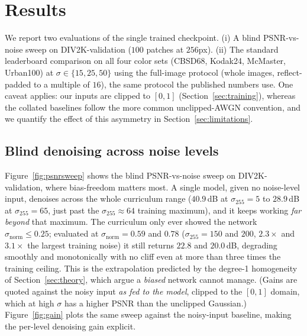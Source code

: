 \documentclass{article}
\newcommand{\sigpx}{\sigma_{255}}
\begin{document}
\clearpage
\section{Results}
\label{sec:results}

We report two evaluations of the single trained checkpoint. (i) A blind PSNR-vs-noise sweep on DIV2K-validation ($100$ patches at $256$px). (ii) The standard leaderboard comparison on all four color sets (CBSD68, Kodak24, McMaster, Urban100) at $\sigma \in \{15,25,50\}$ using the full-image protocol (whole images, reflect-padded to a multiple of $16$), the same protocol the published numbers use. One caveat applies: our inputs are clipped to $[0,1]$ (Section~\ref{sec:training}), whereas the collated baselines follow the more common unclipped-AWGN convention, and we quantify the effect of this asymmetry in Section~\ref{sec:limitations}.

\subsection{Blind denoising across noise levels}
Figure~\ref{fig:psnrsweep} shows the blind PSNR-vs-noise sweep on DIV2K-validation, where bias-freedom matters most. A single model, given no noise-level input, denoises across the whole curriculum range ($40.9$\,dB at $\sigpx{=}5$ to $28.9$\,dB at $\sigpx{=}65$, just past the $\sigpx{\approx}64$ training maximum), and it keeps working \emph{far beyond} that maximum. The curriculum only ever showed the network $\sigma_{\mathrm{norm}}\!\le\!0.25$; evaluated at $\sigma_{\mathrm{norm}}{=}0.59$ and $0.78$ ($\sigpx{=}150$ and $200$, $2.3\times$ and $3.1\times$ the largest training noise) it still returns $22.8$ and $20.0$\,dB, degrading smoothly and monotonically with no cliff even at more than three times the training ceiling. This is the extrapolation predicted by the degree-1 homogeneity of Section~\ref{sec:theory}, which \citet{mohan2020biasfree} argue a \emph{biased} network cannot manage. (Gains are quoted against the noisy input \emph{as fed to the model}, clipped to the $[0,1]$ domain, which at high $\sigma$ has a higher PSNR than the unclipped Gaussian.) Figure~\ref{fig:gain} plots the same sweep against the noisy-input baseline, making the per-level denoising gain explicit.
\end{document}

